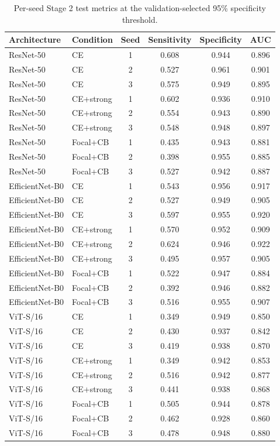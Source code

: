 \begin{table}[h]
\centering
\small
\caption{Per-seed Stage 2 test metrics at the validation-selected 95\% specificity threshold.}
\label{tab:suppstage2}
\begin{tabular}{llcccc}
\toprule
Architecture & Condition & Seed & Sensitivity & Specificity & AUC \\
\midrule
ResNet-50 & CE & 1 & 0.608 & 0.944 & 0.896 \\
ResNet-50 & CE & 2 & 0.527 & 0.961 & 0.901 \\
ResNet-50 & CE & 3 & 0.575 & 0.949 & 0.895 \\
ResNet-50 & CE+strong & 1 & 0.602 & 0.936 & 0.910 \\
ResNet-50 & CE+strong & 2 & 0.554 & 0.943 & 0.890 \\
ResNet-50 & CE+strong & 3 & 0.548 & 0.948 & 0.897 \\
ResNet-50 & Focal+CB & 1 & 0.435 & 0.943 & 0.881 \\
ResNet-50 & Focal+CB & 2 & 0.398 & 0.955 & 0.885 \\
ResNet-50 & Focal+CB & 3 & 0.527 & 0.942 & 0.887 \\
EfficientNet-B0 & CE & 1 & 0.543 & 0.956 & 0.917 \\
EfficientNet-B0 & CE & 2 & 0.527 & 0.949 & 0.905 \\
EfficientNet-B0 & CE & 3 & 0.597 & 0.955 & 0.920 \\
EfficientNet-B0 & CE+strong & 1 & 0.570 & 0.952 & 0.909 \\
EfficientNet-B0 & CE+strong & 2 & 0.624 & 0.946 & 0.922 \\
EfficientNet-B0 & CE+strong & 3 & 0.495 & 0.957 & 0.905 \\
EfficientNet-B0 & Focal+CB & 1 & 0.522 & 0.947 & 0.884 \\
EfficientNet-B0 & Focal+CB & 2 & 0.392 & 0.946 & 0.882 \\
EfficientNet-B0 & Focal+CB & 3 & 0.516 & 0.955 & 0.907 \\
ViT-S/16 & CE & 1 & 0.349 & 0.949 & 0.850 \\
ViT-S/16 & CE & 2 & 0.430 & 0.937 & 0.842 \\
ViT-S/16 & CE & 3 & 0.419 & 0.938 & 0.870 \\
ViT-S/16 & CE+strong & 1 & 0.349 & 0.942 & 0.853 \\
ViT-S/16 & CE+strong & 2 & 0.516 & 0.942 & 0.877 \\
ViT-S/16 & CE+strong & 3 & 0.441 & 0.938 & 0.868 \\
ViT-S/16 & Focal+CB & 1 & 0.505 & 0.944 & 0.878 \\
ViT-S/16 & Focal+CB & 2 & 0.462 & 0.928 & 0.860 \\
ViT-S/16 & Focal+CB & 3 & 0.478 & 0.948 & 0.880 \\
\bottomrule
\end{tabular}
\end{table}
